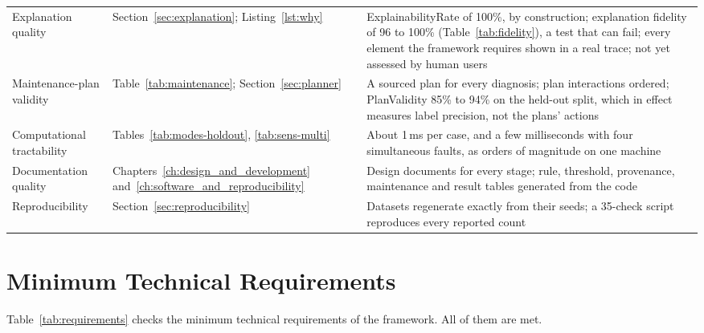 \begin{small}
\begin{longtable}{L{3.2cm}L{3.6cm}L{7.2cm}}
  Explanation quality & Section~\ref{sec:explanation}; Listing~\ref{lst:why} & ExplainabilityRate of 100\%, by construction; explanation fidelity of 96 to 100\% (Table~\ref{tab:fidelity}), a test that can fail; every element the framework requires shown in a real trace; not yet assessed by human users \\
  Maintenance-plan validity & Table~\ref{tab:maintenance}; Section~\ref{sec:planner} & A sourced plan for every diagnosis; plan interactions ordered; PlanValidity 85\% to 94\% on the held-out split, which in effect measures label precision, not the plans' actions \\
  Computational tractability & Tables~\ref{tab:modes-holdout}, \ref{tab:sens-multi} & About 1\,ms per case, and a few milliseconds with four simultaneous faults, as orders of magnitude on one machine \\
  Documentation quality & Chapters~\ref{ch:design_and_development} and~\ref{ch:software_and_reproducibility} & Design documents for every stage; rule, threshold, provenance, maintenance and result tables generated from the code \\
  Reproducibility & Section~\ref{sec:reproducibility} & Datasets regenerate exactly from their seeds; a 35-check script reproduces every reported count \\
  \bottomrule
\end{longtable}
\end{small}

\section{Minimum Technical Requirements}
\label{sec:requirements}

Table~\ref{tab:requirements} checks the minimum technical requirements of the framework. All of them are met.

